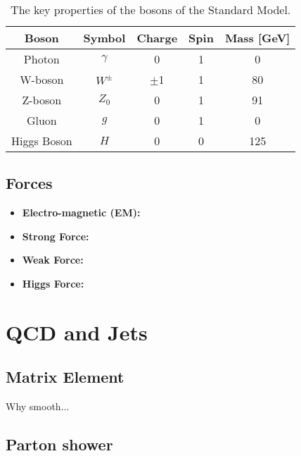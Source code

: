 \begin{itemize}[leftmargin=*]
  {\renewcommand{\arraystretch}{1.5}
  \begin{table}[!ht]
  \begin{center}
    \begin{tabular}{|c||c|c|c|c|}
      \hline
    Boson            & Symbol        & Charge  &  Spin  &  Mass [GeV]\\
    \hline
    Photon           &   $\gamma$    &  0      &  1     &  0 \\
    W-boson          &   $W^{\pm}$    & $\pm$1  &  1     &  80 \\
    Z-boson          &   $Z_0$       &  0      &  1     &  91\\
    Gluon            &   $g$         &  0      &  1     &  0 \\
    Higgs Boson      &   $H$         &  0      &  0     &  125\\
    \hline  
  \end{tabular}
    \caption{The key properties of the bosons of the  Standard Model. }
  \label{tab:theo-sm_bosons}
  \end{center}
  \end{table}}
    
\end{itemize}

  
\subsection{Forces}

\begin{itemize}
\item\textbf{Electro-magnetic (EM):}
  
\item\textbf{Strong Force:}
  
\item\textbf{Weak Force:}

\item\textbf{Higgs Force:}
\end{itemize}
  

\section{QCD and Jets}
\label{theo-qcd}
  
\subsection{Matrix Element}
Why smooth...
\subsection{Parton shower}
